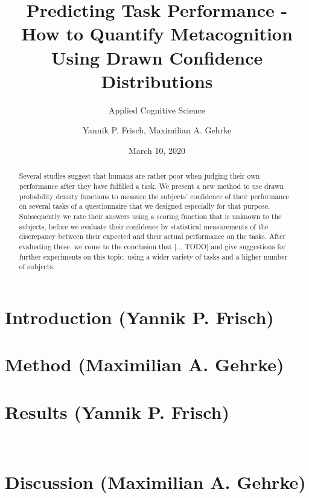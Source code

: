 \documentclass[
pdfa=false,  %
color=9c,
logo=body,
class=article,
marginpar=false,
logofile=../logos/tuda_logo.pdf
]{tudapub}
\author{Yannik P. Frisch, Maximilian A. Gehrke}
\title{Predicting Task Performance - How to Quantify Metacognition Using Drawn Confidence Distributions}
\date{March 10, 2020}
\subtitle{Applied Cognitive Science}
\begin{document}
\maketitle

\begin{abstract}
	Several studies suggest that humans are rather poor when judging their own performance after they have fulfilled a task. We present a new method to use drawn probability density functions to measure the subjects' confidence of their performance on several tasks of a questionnaire that we designed especially for that purpose. Subsequently we rate their answers using a scoring function that is unknown to the subjects, before we evaluate their confidence by statistical measurements of the discrepancy between their expected and their actual performance on the tasks. After evaluating these, we come to the conclusion that [... TODO] and give suggestions for further experiments on this topic, using a wider variety of tasks and a higher number of subjects.
\end{abstract}

\section{Introduction (Yannik P. Frisch)}
	\label{sec:introduction}
	
	
\section{Method (Maximilian A. Gehrke)}
	\label{sec:method}
	
	
\section{Results (Yannik P. Frisch)}
	\label{sec:results}
	
	

\newpage
~
\newpage
~
\newpage
~
\newpage
~
\newpage
\section{Discussion (Maximilian A. Gehrke)}
	\label{sec:discussion}
	


{}

\end{document}
